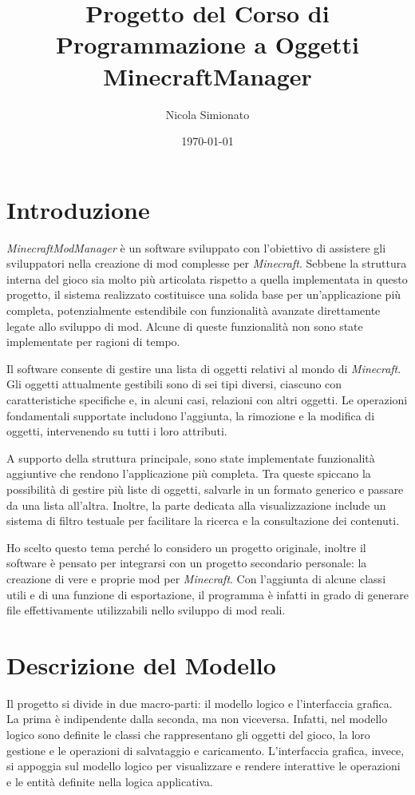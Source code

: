 \documentclass[a4paper,12pt]{article}
\title{\textbf{Progetto del Corso di Programmazione a Oggetti}\\\large MinecraftManager}
\author{Nicola Simionato}
\date{\today}
\begin{document}
\maketitle

\section{Introduzione}

\textit{MinecraftModManager} è un software sviluppato con l'obiettivo di assistere gli sviluppatori nella creazione di mod complesse per \textit{Minecraft}. Sebbene la struttura interna del gioco sia molto più articolata rispetto a quella implementata in questo progetto, il sistema realizzato costituisce una solida base per un’applicazione più completa, potenzialmente estendibile con funzionalità avanzate direttamente legate allo sviluppo di mod. Alcune di queste funzionalità non sono state implementate per ragioni di tempo.

Il software consente di gestire una lista di oggetti relativi al mondo di \textit{Minecraft}. Gli oggetti attualmente gestibili sono di sei tipi diversi, ciascuno con caratteristiche specifiche e, in alcuni casi, relazioni con altri oggetti. Le operazioni fondamentali supportate includono l'aggiunta, la rimozione e la modifica di oggetti, intervenendo su tutti i loro attributi.

A supporto della struttura principale, sono state implementate funzionalità aggiuntive che rendono l’applicazione più completa. Tra queste spiccano la possibilità di gestire più liste di oggetti, salvarle in un formato generico e passare da una lista all’altra. Inoltre, la parte dedicata alla visualizzazione include un sistema di filtro testuale per facilitare la ricerca e la consultazione dei contenuti.

Ho scelto questo tema perché lo considero un progetto originale, inoltre il software è pensato per integrarsi con un progetto secondario personale: la creazione di vere e proprie mod per \textit{Minecraft}. Con l’aggiunta di alcune classi utili e di una funzione di esportazione, il programma è infatti in grado di generare file effettivamente utilizzabili nello sviluppo di mod reali.

\section{Descrizione del Modello}

Il progetto si divide in due macro-parti: il modello logico e l'interfaccia grafica.  
La prima è indipendente dalla seconda, ma non viceversa. Infatti, nel modello logico sono definite le classi che rappresentano gli oggetti del gioco, la loro gestione e le operazioni di salvataggio e caricamento.  
L'interfaccia grafica, invece, si appoggia sul modello logico per visualizzare e rendere interattive le operazioni e le entità definite nella logica applicativa.
\end{document}

